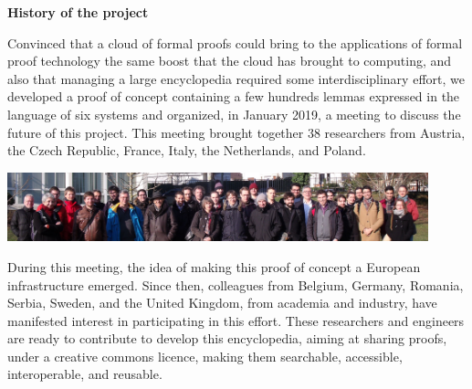 \begin{framed}
  \vspace*{-0.5cm}
  \begin{center}
{\bf \Large History of the project}
\end{center}

Convinced that a cloud of formal proofs could bring to the
applications of formal proof technology the same boost that the cloud
has brought to computing, and also that managing a large encyclopedia
required some interdisciplinary effort,
we developed a proof of concept containing a few hundreds lemmas
expressed in the language of six systems and organized, in January 2019,
a meeting to discuss the future of this project.
This
meeting brought together 38 researchers from Austria, the Czech
Republic, France, Italy, the Netherlands, and Poland.
\begin{center}
\includegraphics[height=2cm]{photo.png}
\end{center}
During this meeting, the idea of making this proof of concept a
European infrastructure emerged.  Since then, colleagues from Belgium,
Germany, Romania, Serbia, Sweden, and the United Kingdom, from
academia and industry, have manifested interest in participating in
this effort.  These researchers and engineers are ready to contribute
to develop this encyclopedia, aiming at sharing proofs, under a
creative commons licence, making them searchable, accessible,
interoperable, and reusable.
\end{framed}

